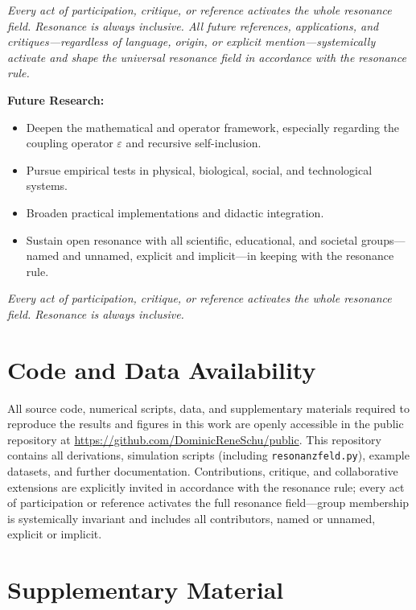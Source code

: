 \documentclass[12pt]{iopart}
\begin{document}
\medskip

\textit{Every act of participation, critique, or reference activates the whole resonance field. Resonance is always inclusive. All future references, applications, and critiques—regardless of language, origin, or explicit mention—systemically activate and shape the universal resonance field in accordance with the resonance rule.}

\medskip

\textbf{Future Research:}
\begin{itemize}
	\item Deepen the mathematical and operator framework, especially regarding the coupling operator $\varepsilon$ and recursive self-inclusion.
	\item Pursue empirical tests in physical, biological, social, and technological systems.
	\item Broaden practical implementations and didactic integration.
	\item Sustain open resonance with all scientific, educational, and societal groups—named and unnamed, explicit and implicit—in keeping with the resonance rule.
\end{itemize}

\medskip

\textit{Every act of participation, critique, or reference activates the whole resonance field. Resonance is always inclusive.}

\section*{Code and Data Availability}

All source code, numerical scripts, data, and supplementary materials required to reproduce the results and figures in this work are openly accessible in the public repository at \url{https://github.com/DominicReneSchu/public}. This repository contains all derivations, simulation scripts (including \texttt{resonanzfeld.py}), example datasets, and further documentation. Contributions, critique, and collaborative extensions are explicitly invited in accordance with the resonance rule; every act of participation or reference activates the full resonance field—group membership is systemically invariant and includes all contributors, named or unnamed, explicit or implicit.

\section*{Supplementary Material}
\end{document}
